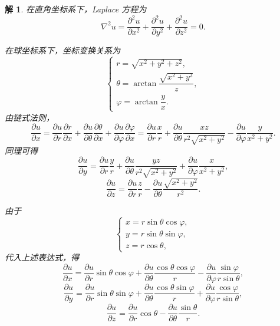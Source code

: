 \documentclass[a4paper,12pt]{article}
\newtheorem*{sol}{解}
\begin{document}
\begin{sol}
    在直角坐标系下，Laplace 方程为
    $$
        \nabla^2u = \frac{\partial^2u}{\partial x^2} + \frac{\partial^2u}{\partial y^2} + \frac{\partial^2u}{\partial z^2} = 0.
    $$
    
    在球坐标系下，坐标变换关系为
    $$
        \begin{cases}
            r = \sqrt{x^2 + y^2 + z^2}, \\
            \theta = \arctan\dfrac{\sqrt{x^2 + y^2}}{z}, \\
            \varphi = \arctan\dfrac{y}{x}.
        \end{cases}
    $$
    由链式法则，
    $$
        \frac{\partial u}{\partial x} = \frac{\partial u}{\partial r}\frac{\partial r}{\partial x} + \frac{\partial u}{\partial \theta}\frac{\partial \theta}{\partial x} + \frac{\partial u}{\partial \varphi}\frac{\partial \varphi}{\partial x} = \frac{\partial u}{\partial r}\frac{x}{r} + \frac{\partial u}{\partial \theta}\frac{xz}{r^2\sqrt{x^2 + y^2}} - \frac{\partial u}{\partial \varphi}\frac{y}{x^2 + y^2}.
    $$
    同理可得
    $$
        \frac{\partial u}{\partial y} = \frac{\partial u}{\partial r}\frac{y}{r} + \frac{\partial u}{\partial \theta}\frac{yz}{r^2\sqrt{x^2 + y^2}} + \frac{\partial u}{\partial \varphi}\frac{x}{x^2 + y^2},
    $$
    $$
        \frac{\partial u}{\partial z} = \frac{\partial u}{\partial r}\frac{z}{r} - \frac{\partial u}{\partial \theta}\frac{\sqrt{x^2 + y^2}}{r^2}.
    $$
    
    由于
    $$
        \begin{cases}
            x = r\sin\theta\cos\varphi, \\
            y = r\sin\theta\sin\varphi, \\
            z = r\cos\theta,
        \end{cases}
    $$
    代入上述表达式，得
    $$
        \frac{\partial u}{\partial x} = \frac{\partial u}{\partial r}\sin\theta\cos\varphi + \frac{\partial u}{\partial \theta}\frac{\cos\theta\cos\varphi}{r} - \frac{\partial u}{\partial \varphi}\frac{\sin\varphi}{r\sin\theta},
    $$
    $$
        \frac{\partial u}{\partial y} = \frac{\partial u}{\partial r}\sin\theta\sin\varphi + \frac{\partial u}{\partial \theta}\frac{\cos\theta\sin\varphi}{r} + \frac{\partial u}{\partial \varphi}\frac{\cos\varphi}{r\sin\theta},
    $$
    $$
        \frac{\partial u}{\partial z} = \frac{\partial u}{\partial r}\cos\theta - \frac{\partial u}{\partial \theta}\frac{\sin\theta}{r}.
    $$
    

\end{sol}
\end{document}
